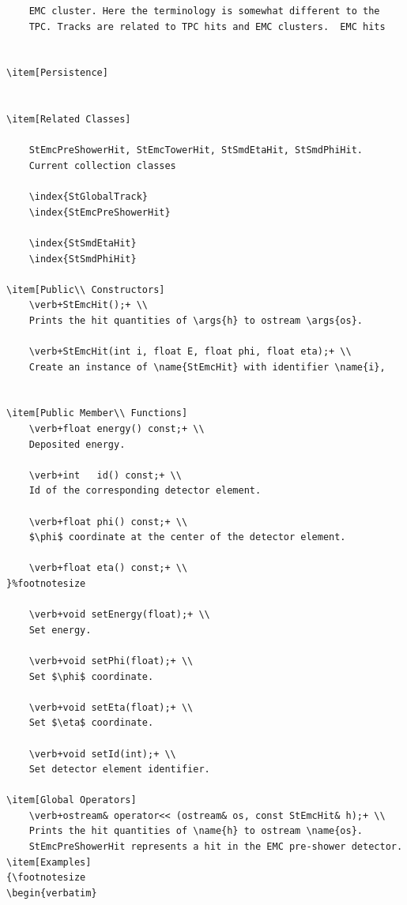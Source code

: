 {\begin{verbatim}
    EMC cluster. Here the terminology is somewhat different to the
    TPC. Tracks are related to TPC hits and EMC clusters.  EMC hits
    

\item[Persistence]
    

\item[Related Classes]
    
    StEmcPreShowerHit, StEmcTowerHit, StSmdEtaHit, StSmdPhiHit.
    Current collection classes
    
    \index{StGlobalTrack}
    \index{StEmcPreShowerHit}
    
    \index{StSmdEtaHit}
    \index{StSmdPhiHit}
    
\item[Public\\ Constructors]
    \verb+StEmcHit();+ \\
    Prints the hit quantities of \args{h} to ostream \args{os}.

    \verb+StEmcHit(int i, float E, float phi, float eta);+ \\
    Create an instance of \name{StEmcHit} with identifier \name{i},
   

\item[Public Member\\ Functions]
    \verb+float energy() const;+ \\
    Deposited energy.

    \verb+int   id() const;+ \\
    Id of the corresponding detector element.

    \verb+float phi() const;+ \\
    $\phi$ coordinate at the center of the detector element.

    \verb+float eta() const;+ \\
}%footnotesize    

    \verb+void setEnergy(float);+ \\
    Set energy.

    \verb+void setPhi(float);+ \\
    Set $\phi$ coordinate.

    \verb+void setEta(float);+ \\
    Set $\eta$ coordinate.

    \verb+void setId(int);+ \\
    Set detector element identifier.

\item[Global Operators]
    \verb+ostream& operator<< (ostream& os, const StEmcHit& h);+ \\
    Prints the hit quantities of \name{h} to ostream \name{os}.
    StEmcPreShowerHit represents a hit in the EMC pre-shower detector.
\item[Examples]
{\footnotesize
\begin{verbatim}
    

\end{verbatim}}
